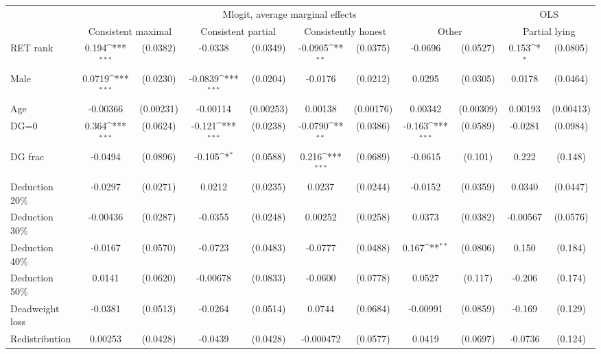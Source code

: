 \def\sym#1{\ifmmode^{#1}\else\(^{#1}\)\fi}
\begin{tabular}{l|cccccccc|cc}
\hline\hline
&\multicolumn{8}{c|}{Mlogit, average marginal effects }&\multicolumn{2}{c}{OLS}\\
                &\multicolumn{2}{c}{Consistent maximal}&\multicolumn{2}{c}{Consistent partial}&\multicolumn{2}{c}{Consistently honest}&\multicolumn{2}{c}{Other}   &\multicolumn{2}{|c}{Partial lying}\\
\hline
RET rank        &    0.194\sym{***}& (0.0382)&  -0.0338         & (0.0349)&  -0.0905\sym{**} & (0.0375)&  -0.0696         & (0.0527)&    0.153\sym{*}  & (0.0805)\\
Male            &   0.0719\sym{***}& (0.0230)&  -0.0839\sym{***}& (0.0204)&  -0.0176         & (0.0212)&   0.0295         & (0.0305)&   0.0178         & (0.0464)\\
Age             & -0.00366         &(0.00231)& -0.00114         &(0.00253)&  0.00138         &(0.00176)&  0.00342         &(0.00309)&  0.00193         &(0.00413)\\
DG=0          &    0.364\sym{***}& (0.0624)&   -0.121\sym{***}& (0.0238)&  -0.0790\sym{**} & (0.0386)&   -0.163\sym{***}& (0.0589)&  -0.0281         & (0.0984)\\
DG frac         &  -0.0494         & (0.0896)&   -0.105\sym{*}  & (0.0588)&    0.216\sym{***}& (0.0689)&  -0.0615         &  (0.101)&    0.222         &  (0.148)\\
Deduction 20\%&  -0.0297         & (0.0271)&   0.0212         & (0.0235)&   0.0237         & (0.0244)&  -0.0152         & (0.0359)&   0.0340         & (0.0447)\\
Deduction 30\%& -0.00436         & (0.0287)&  -0.0355         & (0.0248)&  0.00252         & (0.0258)&   0.0373         & (0.0382)& -0.00567         & (0.0576)\\
Deduction 40\%&  -0.0167         & (0.0570)&  -0.0723         & (0.0483)&  -0.0777         & (0.0488)&    0.167\sym{**} & (0.0806)&    0.150         &  (0.184)\\
Deduction 50\%&   0.0141         & (0.0620)& -0.00678         & (0.0833)&  -0.0600         & (0.0778)&   0.0527         &  (0.117)&   -0.206         &  (0.174)\\
Deadweight loss&  -0.0381         & (0.0513)&  -0.0264         & (0.0514)&   0.0744         & (0.0684)& -0.00991         & (0.0859)&   -0.169         &  (0.129)\\
Redistribution&  0.00253         & (0.0428)&  -0.0439         & (0.0428)&-0.000472         & (0.0577)&   0.0419         & (0.0697)&  -0.0736         &  (0.124)\\

\end{tabular}
